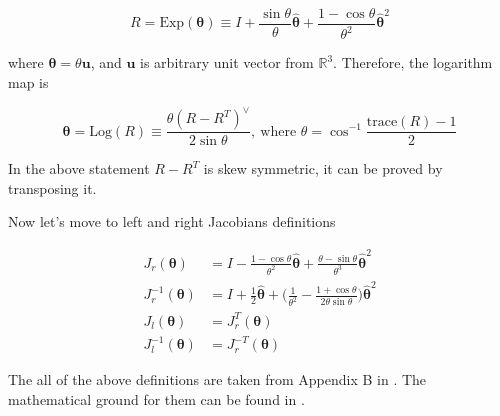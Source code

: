 \begin{equation}
    R = \text{Exp}(\boldsymbol{\theta}) \equiv
    I + \frac{\sin \theta}{\theta} \hat{\boldsymbol{\theta}} +
    \frac{1 - \cos \theta}{\theta^2} \hat{\boldsymbol{\theta}}^2
    \label{eqn:exp_map}
\end{equation}

where $\boldsymbol{\theta} = \theta \mathbf{u}$, and $\mathbf{u}$ is 
arbitrary unit vector from $\mathbb{R}^3$. Therefore, the logarithm map is

\begin{equation}
    \boldsymbol{\theta} = \text{Log}(R) \equiv 
    \frac{\theta (R - R^T)^{\vee}}{2 \sin \theta}, \ 
    \text{where } 
    \theta = \cos^{-1} \frac{\text{trace}(R) - 1}{2}
    \label{eqn:log_map}
\end{equation}

In the above statement $R - R^T$ is skew symmetric, it can be proved by 
transposing it. 

Now let's move to left and right Jacobians definitions 

\begin{equation}
    \begin{aligned}
        J_r(\boldsymbol{\theta}) & = 
        I - \frac{1 - \cos \theta}{\theta^2} \hat{\boldsymbol{\theta}} +
        \frac{\theta - \sin \theta}{\theta^3} \hat{\boldsymbol{\theta}}^2 \\
        J_r^{-1}(\boldsymbol{\theta}) & = 
        I + \frac{1}{2} \hat{\boldsymbol{\theta}} + 
        \biggl( \frac{1}{\theta^2} - 
        \frac{1 + \cos \theta}{2 \theta \sin \theta} \biggr)
        \hat{\boldsymbol{\theta}}^2 \\ 
        J_l(\boldsymbol{\theta}) & = J_r^T(\boldsymbol{\theta}) \\
        J_l^{-1}(\boldsymbol{\theta}) & = J_r^{-T}(\boldsymbol{\theta})
    \end{aligned}
    \label{eqn:l_and_r_jacobians}
\end{equation}

The all of the above definitions are taken from Appendix B in 
\cite{MicroLieTheory}. The mathematical ground for them can be found 
in \cite{LieStochModels}.
